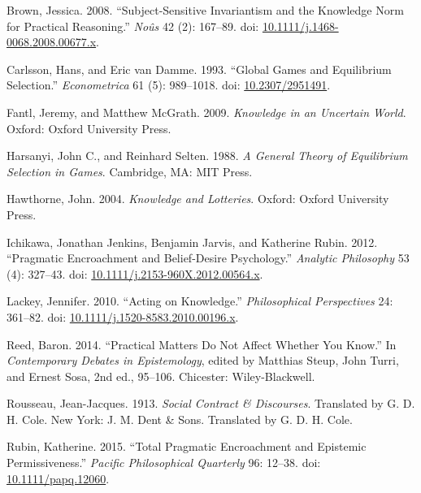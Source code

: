 \documentclass[
  10pt,
  letterpaper,
  DIV=11,
  numbers=noendperiod,
  twoside]{scrartcl}
\newlength{\cslhangindent}
\newenvironment{CSLReferences}[2] %
 {\begin{list}{}{%
  \setlength{\itemindent}{0pt}
  \setlength{\leftmargin}{0pt}
  \setlength{\parsep}{0pt}
  \ifodd #1
   \setlength{\leftmargin}{\cslhangindent}
   \setlength{\itemindent}{-1\cslhangindent}
  \fi
  \setlength{\itemsep}{#2\baselineskip}}}
 {\end{list}}
\begin{document}
\label{refs}
\begin{CSLReferences}{1}{0}
Brown, Jessica. 2008. {``Subject-Sensitive Invariantism and the
Knowledge Norm for Practical Reasoning.''} \emph{No{û}s} 42 (2):
167--89. doi:
\href{https://doi.org/10.1111/j.1468-0068.2008.00677.x}{10.1111/j.1468-0068.2008.00677.x}.

Carlsson, Hans, and Eric van Damme. 1993. {``Global Games and
Equilibrium Selection.''} \emph{Econometrica} 61 (5): 989--1018. doi:
\href{https://doi.org/10.2307/2951491}{10.2307/2951491}.

Fantl, Jeremy, and Matthew McGrath. 2009. \emph{Knowledge in an
Uncertain World}. Oxford: Oxford University Press.

Harsanyi, John C., and Reinhard Selten. 1988. \emph{A General Theory of
Equilibrium Selection in Games}. Cambridge, MA: {MIT} Press.

Hawthorne, John. 2004. \emph{Knowledge and Lotteries}. Oxford: Oxford
University Press.

Ichikawa, Jonathan Jenkins, Benjamin Jarvis, and Katherine Rubin. 2012.
{``Pragmatic Encroachment and Belief-Desire Psychology.''}
\emph{Analytic Philosophy} 53 (4): 327--43. doi:
\href{https://doi.org/10.1111/j.2153-960X.2012.00564.x}{10.1111/j.2153-960X.2012.00564.x}.

Lackey, Jennifer. 2010. {``Acting on Knowledge.''} \emph{Philosophical
Perspectives} 24: 361--82. doi:
\href{https://doi.org/10.1111/j.1520-8583.2010.00196.x}{10.1111/j.1520-8583.2010.00196.x}.

Reed, Baron. 2014. {``Practical Matters Do Not Affect Whether You
Know.''} In \emph{Contemporary Debates in Epistemology}, edited by
Matthias Steup, John Turri, and Ernest Sosa, 2nd ed., 95--106.
Chicester: Wiley-Blackwell.

Rousseau, Jean-Jacques. 1913. \emph{Social Contract \& Discourses}.
Translated by G. D. H. Cole. New York: J. M. Dent \& Sons. Translated by
G. D. H. Cole.

Rubin, Katherine. 2015. {``Total Pragmatic Encroachment and Epistemic
Permissiveness.''} \emph{Pacific Philosophical Quarterly} 96: 12--38.
doi: \href{https://doi.org/10.1111/papq.12060}{10.1111/papq.12060}.


\end{CSLReferences}
\end{document}
